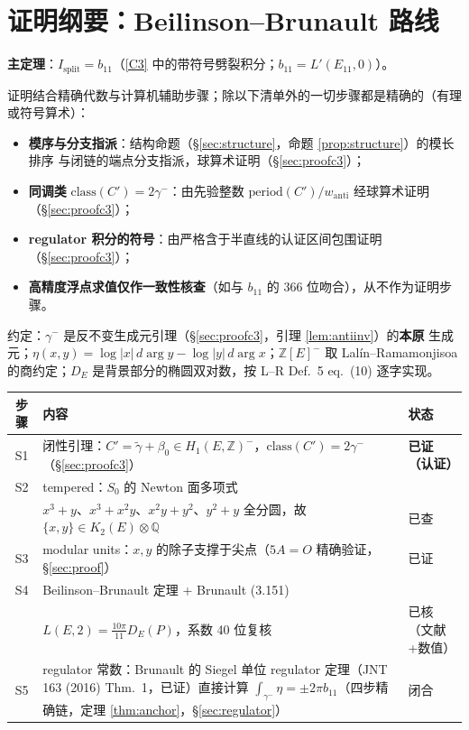\documentclass[11pt,a4paper]{ctexart}
\theoremstyle{remark}
\newcommand{\QQ}{\mathbb{Q}}
\newcommand{\ZZ}{\mathbb{Z}}
\newcommand{\bN}{b_{11}}
\newcommand{\Isplit}{I_{\mathrm{split}}}
\begin{document}
\section{证明纲要：Beilinson--Brunault 路线}\label{sec:outline}

\textbf{主定理}：$\Isplit=\bN$（\eqref{C3} 中的带符号劈裂积分；$\bN=L'(E_{11},0)$）。

证明结合精确代数与计算机辅助步骤；除以下清单外的一切步骤都是精确的（有理或符号算术）：
\begin{itemize}[nosep]
\item \textbf{模序与分支指派}：结构命题（\S\ref{sec:structure}，命题 \ref{prop:structure}）的模长排序
与闭链的端点分支指派，球算术证明（\S\ref{sec:proofc3}）；
\item \textbf{同调类} $\mathrm{class}(C')=2\gamma^-$：由先验整数
$\mathrm{period}(C')/w_{\mathrm{anti}}$ 经球算术证明（\S\ref{sec:proofc3}）；
\item \textbf{regulator 积分的符号}：由严格含于半直线的认证区间包围证明（\S\ref{sec:proofc3}）；
\item \textbf{高精度浮点求值仅作一致性核查}（如与 $\bN$ 的 366 位吻合），从不作为证明步骤。
\end{itemize}

约定：$\gamma^-$ 是反不变生成元引理（\S\ref{sec:proofc3}，引理 \ref{lem:antiinv}）的\textbf{本原}
生成元；$\eta(x,y)=\log|x|\,d\arg y-\log|y|\,d\arg x$；$\ZZ[E]^-$ 取
Lal\'in--Ramamonjisoa 的商约定；$D_E$ 是背景部分的椭圆双对数，按 L--R Def.~5 eq.~(10) 逐字实现。

\begin{center}\footnotesize
\begin{tabular}{c p{} l}
\hline
步骤 & 内容 & 状态 \\
\hline
S1 & 闭性引理：$C'=\tilde\gamma+\beta_0\in H_1(E,\ZZ)^-$，$\mathrm{class}(C')=2\gamma^-$（\S\ref{sec:proofc3}） & \textbf{已证（认证）} \\
S2 & tempered：$S_0$ 的 Newton 面多项式 & \\
   & $x^3+y$、$x^3+x^2y$、$x^2y+y^2$、$y^2+y$ 全分圆，故 $\{x,y\}\in K_2(E)\otimes\QQ$ & 已查 \\
S3 & modular units：$x,y$ 的除子支撑于尖点（$5A=O$ 精确验证，\S\ref{sec:proof}） & 已证 \\
S4 & Beilinson--Brunault 定理 + Brunault (3.151) & \\
   & $L(E,2)=\frac{10\pi}{11}D_E(P)$，系数 40 位复核 & 已核（文献+数值） \\
S5 & regulator 常数：Brunault 的 Siegel 单位 regulator 定理（JNT 163 (2016) Thm.~1，已证）直接计算 $\int_{\gamma^-}\eta=\pm2\pi\bN$（四步精确链，定理 \ref{thm:anchor}，\S\ref{sec:regulator}） & 闭合 \\
\hline
\end{tabular}
\end{center}
\end{document}
